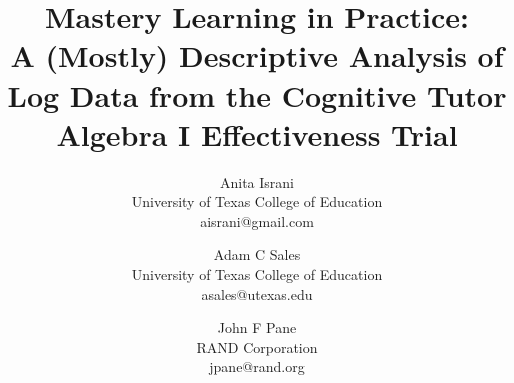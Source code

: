 
\usepackage{xcolor}
\usepackage{url}


 \usepackage{subcaption}
\usepackage{makecell}
\usepackage{amsmath}



\title{Mastery Learning in Practice:\\
A (Mostly) Descriptive Analysis of Log Data from the Cognitive Tutor Algebra I Effectiveness Trial}

\author{{\large Anita Israni}\\University of Texas College of
  Education\\aisrani@gmail.com \and {\large Adam C Sales}\\University of Texas College of
  Education\\asales@utexas.edu  \and {\large John F Pane}\\RAND Corporation\\jpane@rand.org}


\date{}
